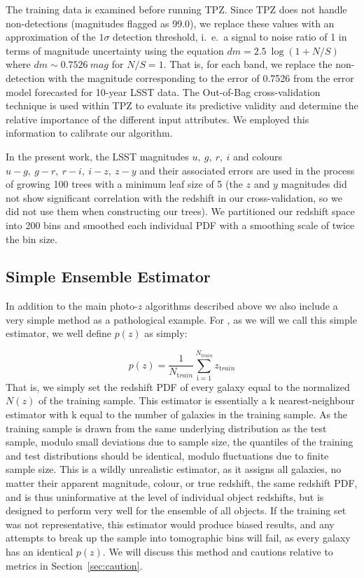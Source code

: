 The training data is examined before running TPZ. Since TPZ does not handle non-detections (magnitudes flagged as 99.0), we replace these values with an approximation of the $1\sigma$ detection threshold, i.~e.~a signal to noise ratio of 1 in terms of magnitude uncertainty using the equation $dm = 2.5 ~ \log ( 1 + N/S )$ where $dm \sim 0.7526 ~ mag$ for $N/S=1$.  That is, for each band, we replace the non-detection with the magnitude corresponding to the error of 0.7526 from the error model forecasted for 10-year LSST data. The Out-of-Bag \citep{Breiman:84,Carrasco_Kind:13} cross-validation technique is used within TPZ to evaluate its predictive validity and determine the relative importance of the different input attributes. We employed this information to calibrate our algorithm.

In the present work, the LSST magnitudes $u,~g,~r,~i$ and colours $u-g,~g-r,~r-i,~i-z,~z-y$ and their associated errors are used in the process of growing 100 trees with a minimum leaf size of 5 (the $z$ and $y$ magnitudes did not show significant correlation with the redshift in our cross-validation, so we did not use them when constructing our trees). We partitioned our redshift space into 200 bins and smoothed each individual PDF with a smoothing scale of twice the bin size.

\subsection{Simple Ensemble Estimator}\label{sec:method:trainz}
In addition to the main photo-$z$ algorithms described above we also include a very simple method as a pathological example.  For \trainz, as we will we call this simple estimator, we well define $p(z)$ as simply:

\begin{equation}
p(z) = \frac{1}{N_{ \mathrm train}}\sum_{\mathrm i=1}^{N_{\mathrm train}}z_{\mathrm train}
\end{equation}
That is, we simply set the redshift PDF of every galaxy equal to the normalized $N(z)$ of the training sample.  This estimator is essentially a k nearest-neighbour estimator with k equal to the number of galaxies in the training sample.  As the training sample is drawn from the same underlying distribution as the test sample, modulo small deviations due to sample size, the quantiles of the training and test distributions should be identical, modulo fluctuations due to finite sample size.  This is a wildly unrealistic estimator, as it assigns all galaxies, no matter their apparent magnitude, colour, or true redshift, the same redshift PDF, and is thus uninformative at the level of individual object redshifts, but is designed to perform very well for the ensemble of all objects.  If the training set was not representative, this estimator would produce biased results, and any attempts to break up the sample into tomographic bins will fail, as every galaxy has an identical $p(z)$.  We will discuss this method and cautions relative to metrics in Section~\ref{sec:caution}.
